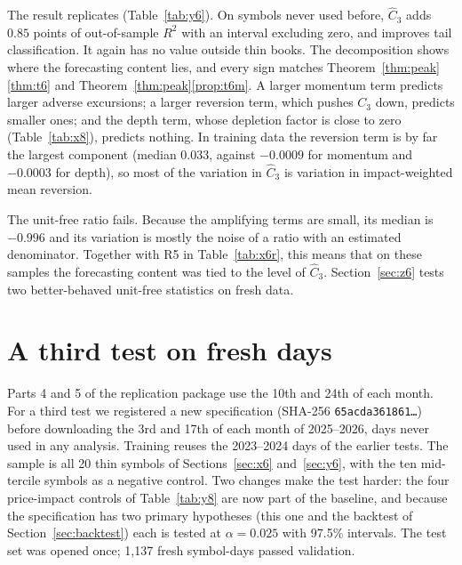 \documentclass[12pt]{article}
\theoremstyle{definition}
\theoremstyle{remark}
\begin{document}
The result replicates (Table~\ref{tab:y6}). On symbols never used before, $\hat C_3$ adds $0.85$ points of out-of-sample $R^2$ with an interval excluding zero, and improves tail classification. It again has no value outside thin books. The decomposition shows where the forecasting content lies, and every sign matches Theorem~\ref{thm:peak}\ref{thm:t6} and Theorem~\ref{thm:peak}\ref{prop:t6m}. A larger momentum term predicts larger adverse excursions; a larger reversion term, which pushes $C_3$ down, predicts smaller ones; and the depth term, whose depletion factor is close to zero (Table~\ref{tab:x8}), predicts nothing. In training data the reversion term is by far the largest component (median $0.033$, against $-0.0009$ for momentum and $-0.0003$ for depth), so most of the variation in $\hat C_3$ is variation in impact-weighted mean reversion.

The unit-free ratio fails. Because the amplifying terms are small, its median is $-0.996$ and its variation is mostly the noise of a ratio with an estimated denominator. Together with R5 in Table~\ref{tab:x6r}, this means that on these samples the forecasting content was tied to the level of $\hat C_3$. Section~\ref{sec:z6} tests two better-behaved unit-free statistics on fresh data.

\section{A third test on fresh days}
Parts 4 and 5 of the replication package use the 10th and 24th of each month. For a third test we registered a new specification (SHA-256 \texttt{65acda361861\ldots}) before downloading the 3rd and 17th of each month of 2025--2026, days never used in any analysis. Training reuses the 2023--2024 days of the earlier tests. The sample is all 20 thin symbols of Sections~\ref{sec:x6} and~\ref{sec:y6}, with the ten mid-tercile symbols as a negative control. Two changes make the test harder: the four price-impact controls of Table~\ref{tab:y8} are now part of the baseline, and because the specification has two primary hypotheses (this one and the backtest of Section~\ref{sec:backtest}) each is tested at $\alpha=0.025$ with 97.5\% intervals. The test set was opened once; 1{,}137 fresh symbol-days passed validation.
\end{document}
